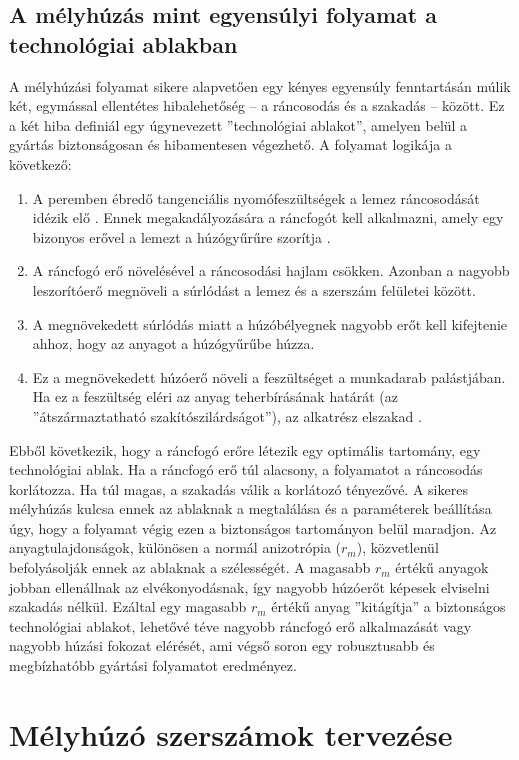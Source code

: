 \documentclass[12pt,a4paper,oneside]{report}
\begin{document}
\subsection{A mélyhúzás mint egyensúlyi folyamat a technológiai ablakban}
A mélyhúzási folyamat sikere alapvetően egy kényes egyensúly fenntartásán múlik két,
egymással ellentétes hibalehetőség – a ráncosodás és a szakadás – között. Ez a két hiba
definiál egy úgynevezett ”technológiai ablakot”, amelyen belül a gyártás biztonságosan
és hibamentesen végezhető.
A folyamat logikája a következő:
\begin{enumerate}
    \item A peremben ébredő tangenciális nyomófeszültségek a lemez ráncosodását idézik elő \cite{Papeleux2002}. Ennek megakadályozására a ráncfogót kell alkalmazni, amely egy bizonyos erővel a lemezt a húzógyűrűre szorítja \cite{Papeleux2002}.
    \item A ráncfogó erő növelésével a ráncosodási hajlam csökken. Azonban a nagyobb leszorítóerő megnöveli a súrlódást a lemez és a szerszám felületei között.
    \item A megnövekedett súrlódás miatt a húzóbélyegnek nagyobb erőt kell kifejtenie ahhoz, hogy az anyagot a húzógyűrűbe húzza.
    \item Ez a megnövekedett húzóerő növeli a feszültséget a munkadarab palástjában. Ha ez a feszültség eléri az anyag teherbírásának határát (az ”átszármaztatható szakítószilárdságot”), az alkatrész elszakad \cite{Papeleux2002}.
\end{enumerate}
Ebből következik, hogy a ráncfogó erőre létezik egy optimális tartomány, egy technológiai ablak. Ha a ráncfogó erő túl alacsony, a folyamatot a ráncosodás korlátozza. Ha
túl magas, a szakadás válik a korlátozó tényezővé. A sikeres mélyhúzás kulcsa ennek az
ablaknak a megtalálása és a paraméterek beállítása úgy, hogy a folyamat végig ezen a
biztonságos tartományon belül maradjon.
Az anyagtulajdonságok, különösen a normál anizotrópia ($r_m$), közvetlenül befolyásolják
ennek az ablaknak a szélességét. A magasabb $r_m$ értékű anyagok jobban ellenállnak az
elvékonyodásnak, így nagyobb húzóerőt képesek elviselni szakadás nélkül. Ezáltal egy
magasabb $r_m$ értékű anyag ”kitágítja” a biztonságos technológiai ablakot, lehetővé téve
nagyobb ráncfogó erő alkalmazását vagy nagyobb húzási fokozat elérését, ami végső soron
egy robusztusabb és megbízhatóbb gyártási folyamatot eredményez.

\section{Mélyhúzó szerszámok tervezése}
\end{document}
